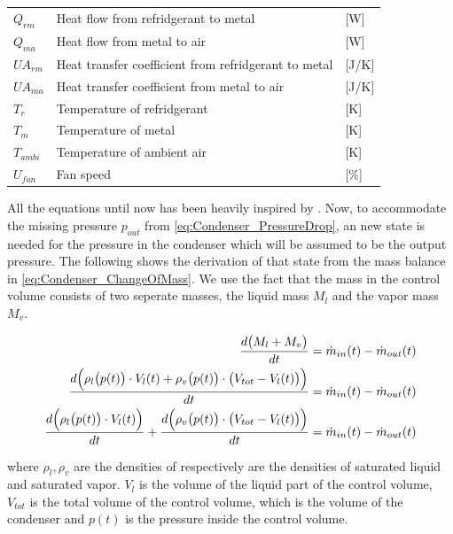 \begin{center}
	\begin{tabular}{l p{8cm} l}
		$Q_{rm}$				&	Heat flow from refridgerant to metal					& [\si{W}] \\
		$Q_{ma}$				&	Heat flow from metal to air								& [\si{W}] \\
		$U A_{rm}$				& 	Heat transfer coefficient from refridgerant to metal 	& [\si{J}/\si{K}] \\
		$U A_{ma}$				& 	Heat transfer coefficient from metal to air				& [\si{J}/\si{K}] \\
		$T_r$					& 	Temperature of refridgerant 							& [\si{K}] \\
		$T_m$					&	Temperature of metal 									& [\si{K}] \\
		$T_{ambi}$				&	Temperature of ambient air 								& [\si{K}] \\
		$U_{fan}$				&	Fan speed												& [$\%$] \\
	\end{tabular}
\end{center}

All the equations until now has been heavily inspired by \cite{Sorensen2013}.
Now, to accommodate the missing pressure $ p_{out} $ from \cref{eq:Condenser_PressureDrop}, an new state is needed for the pressure in the condenser which will be assumed to be the output pressure. The following shows the derivation of that state from the mass balance in \cref{eq:Condenser_ChangeOfMass}. We use the fact that the mass in the control volume consists of two seperate masses, the liquid mass $ M_l $ and the vapor mass $ M_v $.


\begin{align}
		 		\frac{d \bigl(M_{l} + M_{v}\bigr) }{dt} & = \dot{m}_{in}(t) - \dot{m}_{out}(t) 		\label{eq:Condenser_pres1}\\
		 		\frac{d \Bigl(\rho_{l}\bigl(p(t)\bigr)\cdot V_l(t) + \rho_{v}\bigl(p(t)\bigr)\cdot \bigl(V_{tot} - V_l(t)\bigr)\Bigr) }{dt} & = \dot{m}_{in}(t) - \dot{m}_{out}(t)		\label{eq:Condenser_pres2}\\
		 		\frac{d \Bigl(\rho_{l}\bigl(p(t)\bigr)\cdot V_l(t)\Bigr)}{dt} + \frac{d \Bigl(\rho_{v}\bigl(p(t)\bigr)\cdot \bigl(V_{tot} - V_l(t)\bigr)\Bigr) }{dt} & = \dot{m}_{in}(t) - \dot{m}_{out}(t)		\label{eq:Condenser_pres3}
\end{align}

where $\rho_{l}, \rho_{v}$ are the densities of respectively are the densities of saturated liquid and saturated vapor. $ V_l$ is the volume of the liquid part of the control volume, $V_{tot} $ is the total volume of the control volume, which is the volume of the condenser and $p(t)$ is the pressure inside the control volume.

